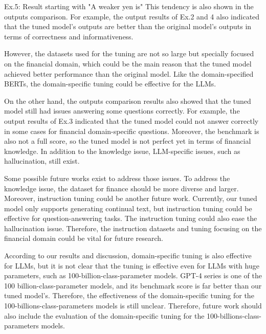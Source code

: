\begin{brekableitembox}{Ex.5: Result starting with "A weaker yen is"}
This tendency is also shown in the outputs comparison.
For example, the output results of Ex.2 and 4 also indicated that the tuned model's outputs are better than the original model's outputs in terms of correctness and informativeness.

However, the datasets used for the tuning are not so large but specially focused on the financial domain, which could be the main reason that the tuned model achieved better performance than the original model.
Like the domain-specified BERTs, the domain-specific tuning could be effective for the LLMs.

On the other hand, the outputs comparison results also showed that the tuned model still had issues answering some questions correctly.
For example, the output results of Ex.3 indicated that the tuned model could not answer correctly in some cases for financial domain-specific questions.
Moreover, the benchmark is also not a full score, so the tuned model is not perfect yet in terms of financial knowledge.
In addition to the knowledge issue, LLM-specific issues, such as hallucination, still exist.

Some possible future works exist to address those issues.
To address the knowledge issue, the dataset for finance should be more diverse and larger.
Moreover, instruction tuning \cite{wei2021finetuned} could be another future work.
Currently, our tuned model only supports generating continual text, but instruction tuning could be effective for question-answering tasks.
The instruction tuning could also ease the hallucination issue.
Therefore, the instruction datasets and tuning focusing on the financial domain could be vital for future research.

According to our results and discussion, domain-specific tuning is also effective for LLMs, but it is not clear that the tuning is effective even for LLMs with huge parameters, such as 100-billion-class-parameter models.
GPT-4 series is one of the 100 billion-class-parameter models, and its benchmark score is far better than our tuned model's.
Therefore, the effectiveness of the domain-specific tuning for the 100-billions-class-parameters models is still unclear.
Therefore, future work should also include the evaluation of the domain-specific tuning for the 100-billions-class-parameters models.


\end{brekableitembox}
